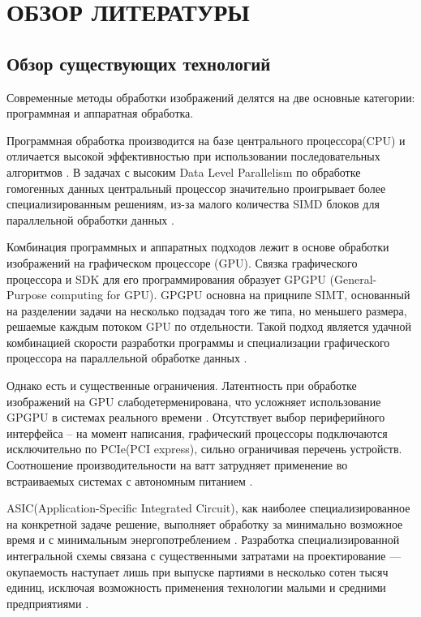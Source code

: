 \section{ОБЗОР ЛИТЕРАТУРЫ}
\label{sec:domain}

\subsection{Обзор существующих технологий}
\label{sub:domain:technologies_review}

Современные методы обработки изображений делятся на две основные категории: программная и аппаратная обработка.

Программная обработка производится на базе центрального процессора(CPU) и отличается высокой эффективностью
при использовании последовательных алгоритмов \cite{asano_dip_comp}. В задачах с высоким Data Level Parallelism по обработке гомогенных данных
центральный процессор значительно проигрывает более специализированным решениям,
из-за малого количества SIMD блоков для параллельной обработки данных \cite{axell_cpu_simd}.

Комбинация программных и аппаратных подходов лежит в основе обработки изображений на графическом процессоре (GPU).
Связка графического процессора и SDK для его программирования образует GPGPU (General-Purpose computing for GPU).
GPGPU основна на прицнипе SIMT, основанный на разделении задачи на несколько подзадач того же типа, но меньшего размера,
решаемые каждым потоком GPU по отдельности.
Такой подход является удачной комбинацией скорости разработки программы и специализации графического процессора
на параллельной обработке данных \cite{patterson_hennessy}.

Однако есть и существенные ограничения.
Латентность при обработке изображений на GPU слабодетерменирована, что усложняет использование GPGPU
в системах реального времени \cite{maceina_gpu_real_time}.
Отсутствует выбор периферийного интерфейса -- на момент написания,
графический процессоры подключаются исключительно по PCIe(PCI express), сильно ограничивая перечень устройств.
Соотношение производительности на ватт затрудняет применение во встраиваемых системах с автономным питанием \cite{fowers_gpu_power_consumption}.

ASIC(Application-Specific Integrated Circuit), как наиболее специализированное на конкретной задаче решение, выполняет обработку за минимально возможное время
и с минимальным энергопотреблением \cite{amara_asic_low_power}. Разработка специализированной интегральной схемы связана
с существенными затратами на проектирование --- окупаемость наступает лишь при выпуске партиями в несколько сотен тысяч единиц,
исключая возможность применения технологии малыми и средними предприятиями \cite{smith_asic_economy}.

